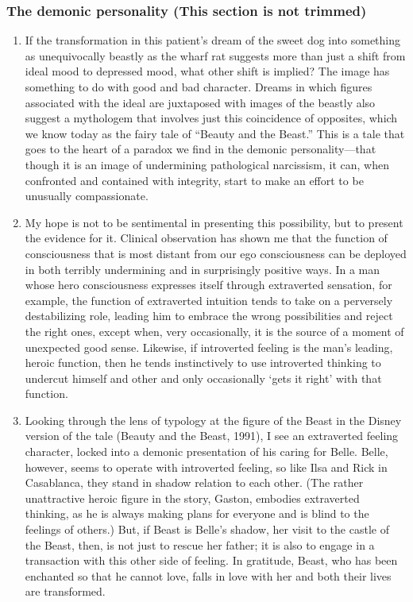 \subsubsection{The demonic personality {\footnotesize (This section is not trimmed)}}

\begin{enumerate}

\item {} If
the transformation in this patient’s dream of the sweet dog into something as
unequivocally beastly as the wharf rat suggests more than just a shift from
ideal mood to depressed mood, what other shift is implied? The image has
something to do with good and bad character. Dreams in which figures associated
with the ideal are juxtaposed with images of the beastly also suggest a
mythologem that involves just this coincidence of opposites, which we know
today as the fairy tale of “Beauty and the Beast.” This is a tale that goes to
the heart of a paradox we find in the demonic personality—that though it is an
image of undermining pathological narcissism, it can, when confronted and
contained with integrity, start to make an effort to be unusually
compassionate.

\item {} My hope is not to be
sentimental in presenting this possibility, but to present the evidence for it.
Clinical observation has shown me that the function of consciousness that is
most distant from our ego consciousness can be deployed in both terribly
undermining and in surprisingly positive ways. In a man whose hero
consciousness expresses itself through extraverted sensation, for example, the
function of extraverted intuition tends to take on a perversely destabilizing
role, leading him to embrace the wrong possibilities and reject the right ones,
except when, very occasionally, it is the source of a moment of unexpected good
sense. Likewise, if introverted feeling is the man’s leading, heroic function,
then he tends instinctively to use introverted thinking to undercut himself and
other and only occasionally ‘gets it right’ with that function.

\item {} Looking through the lens of typology
at the figure of the Beast in the Disney version of the tale (Beauty and the
Beast, 1991), I see an extraverted feeling character, locked into a demonic
presentation of his caring for Belle. Belle, however, seems to operate with
introverted feeling, so like Ilsa and Rick in Casablanca, they stand in shadow
relation to each other. (The rather unattractive heroic figure in the story,
Gaston, embodies extraverted thinking, as he is always making plans for
everyone and is blind to the feelings of others.) But, if Beast is Belle’s
shadow, her visit to the castle of the Beast, then, is not just to rescue her
father; it is also to engage in a transaction with this other side of feeling.
In gratitude, Beast, who has been enchanted so that he cannot love, falls in
love with her and both their lives are transformed.


\end{enumerate}
